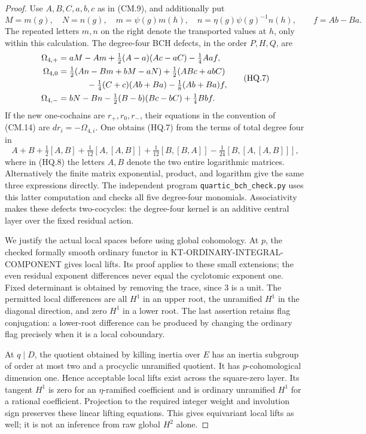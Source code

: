 \begin{proof}
Use \(A,B,C,a,b,c\) as in (CM.9), and additionally put
\[
 M=m(g),\quad N=n(g),\quad
 m=\psi(g)m(h),\quad n=\eta(g)\psi(g)^{-1}n(h),
 \qquad f=Ab-Ba.
                                                        \tag{HQ.6}
\]
The repeated letters \(m,n\) on the right denote the
transported values at \(h\), only within this calculation.
The degree-four BCH defects, in the order \(P,H,Q\), are
\[
\begin{split}
 \Omega_{4,+}
   & =aM-Am+\tfrac12(A-a)(Ac-aC)-\tfrac14Aa f,\\
 \Omega_{4,0}
   & =\tfrac12(An-Bm+bM-aN)+\tfrac12(ABc+abC)\\
   &\hspace{12mm}-\tfrac14(C+c)(Ab+Ba)-\tfrac18(Ab+Ba)f,\\
 \Omega_{4,-}
   & =bN-Bn-\tfrac12(B-b)(Bc-bC)+\tfrac14Bb f.
\end{split}                                               \tag{HQ.7}
\]
If the new one-cochains are \(r_+,r_0,r_-\), their
equations in the convention of (CM.14) are
\(dr_i=-\Omega_{4,i}\).
One obtains (HQ.7) from the terms of total degree four in
\[
 A+B+\tfrac12[A,B]+\tfrac1{12}[A,[A,B]]
 +\tfrac1{12}[B,[B,A]]-\tfrac1{24}[B,[A,[A,B]]],
                                                        \tag{HQ.8}
\]
where in (HQ.8) the letters \(A,B\) denote the two
entire logarithmic matrices.  Alternatively the finite
matrix exponential, product, and logarithm give the same
three expressions directly.  The independent program
\texttt{quartic\_bch\_check.py} uses this latter computation
and checks all five degree-four monomials.
Associativity makes these defects two-cocycles: the
degree-four kernel is an additive central layer over
the fixed residual action.

We justify the actual local spaces before using global
cohomology.  At \(p\), the checked formally smooth
ordinary functor in KT-ORDINARY-INTEGRAL-COMPONENT gives
local lifts.  Its proof applies to these small extensions;
the even residual exponent differences never equal the
cyclotomic exponent one.  Fixed determinant is obtained
by removing the trace, since \(3\) is a unit.
The permitted local differences are all \(H^1\) in
an upper root, the unramified \(H^1\) in the diagonal
direction, and zero \(H^1\) in a lower root.  The last
assertion retains flag conjugation: a lower-root
difference can be produced by changing the ordinary
flag precisely when it is a local coboundary.

At \(q\mid D\), the quotient obtained by killing
inertia over \(E\) has an inertia subgroup of order
at most two and a procyclic unramified quotient.
It has \(p\)-cohomological dimension one.  Hence
acceptable local lifts exist across the square-zero
layer.  Its tangent \(H^1\) is zero for an
\(\eta\)-ramified coefficient and is ordinary
unramified \(H^1\) for a rational coefficient.
Projection to the required integer weight and
involution sign preserves these linear lifting
equations.  This gives equivariant local lifts as
well; it is not an inference from raw global
\(H^2\) alone.


\end{proof}
